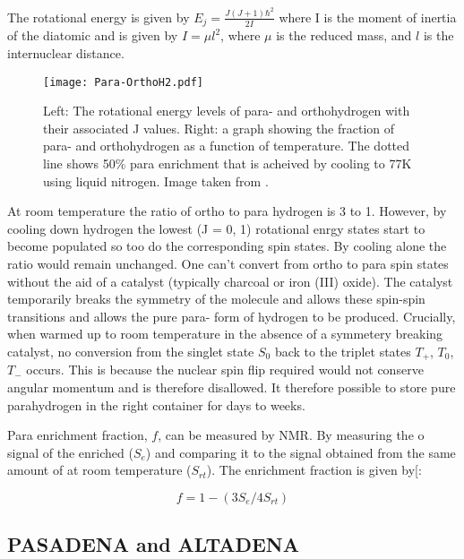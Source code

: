 The rotational energy is given by $E_j = \frac{J(J+1)\hbar^2}{2I}$
where I is the moment of inertia of the diatomic and is given by $I = \mu l^2$, where $\mu$ is the reduced mass,
and $l$ is the internuclear distance.

\begin{figure*}
  \begin{center}
  \texttt{[image: Para-OrthoH2.pdf]}
  \end{center}
  \caption{Left: The rotational energy levels of para- and orthohydrogen with their associated J values. Right: a graph
  showing the fraction of para- and orthohydrogen as a function of temperature. The dotted line shows 50\% para
  enrichment that is acheived by cooling to 77K using liquid nitrogen. Image taken from \citep{barskiy2017nmr}.}
  \label{fig:POH2}
\end{figure*}


At room temperature the ratio of ortho to para hydrogen is 3 to 1. However, by cooling down hydrogen the lowest (J = 0, 1) rotational enrgy states start to become populated so too do the corresponding spin states. By cooling alone the ratio would remain unchanged. One can't convert from ortho to para spin states without the aid of a catalyst (typically charcoal or iron (III) oxide). The catalyst temporarily breaks the symmetry of the  molecule and allows these spin-spin transitions and allows the pure para- form of hydrogen to be produced. Crucially, when warmed up to
room temperature in the absence of a symmetery breaking catalyst, no conversion from the singlet state $S_0$ back to
the triplet states $T_+$, $T_0$, $T_-$ occurs. This is because the nuclear spin flip required would not
conserve angular momentum and is therefore disallowed. It therefore possible to store pure parahydrogen
in the right container for days to weeks.

Para enrichment fraction, $f$, can be measured by NMR. By measuring the o signal of the enriched  ($S_{e}$) and comparing it to the signal obtained from the same amount of  at room temperature ($S_{rt}$). The enrichment fraction is given by[\citep{RN131, RN132}:

\begin{equation}\label{pfrac}
  f = 1 -(3S_{e}/4S_{rt})
\end{equation}

\subsection{PASADENA and ALTADENA}\label{PASADENA and ALTADENA}

